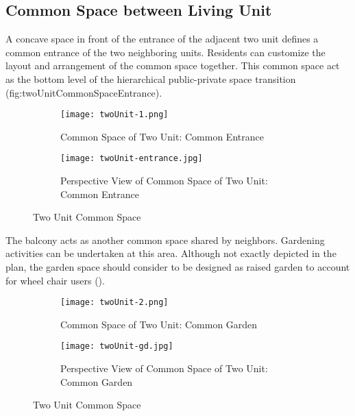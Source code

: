 \subsection{Common Space between Living Unit}
A concave space in front of the entrance of the adjacent two unit
defines a common entrance of the two neighboring units. Residents can
customize the layout and arrangement of the common space
together. This common space act as the bottom level of the
hierarchical public-private space transition
({fig:twoUnitCommonSpaceEntrance}).~
\begin{figure}[h!]
\centering
\begin{subfigure}{\textwidth}
  \centering
  \texttt{[image: twoUnit-1.png]}
  \caption{Common Space of Two Unit: Common Entrance}
  \label{fig:twoUnit-1}
\end{subfigure}
\begin{subfigure}{\textwidth}
  \centering
  \texttt{[image: twoUnit-entrance.jpg]}
  \caption{Perspective View of Common Space of Two Unit: Common Entrance}
  \label{fig:twoUnit-entrance}
\end{subfigure}
\caption{Two Unit Common Space}
\label{fig:twoUnitCommonSpaceEntrance}
\end{figure}

\clearpage
The balcony acts as another common space shared by
neighbors. Gardening activities can be undertaken at this
area. Although not exactly depicted in the plan, the garden space
should consider to be designed as raised garden to account for wheel
chair users ().~
\begin{figure}[h!]
\centering
\begin{subfigure}{\textwidth}
  \centering
  \texttt{[image: twoUnit-2.png]}
  \caption{Common Space of Two Unit: Common Garden}
  \label{fig:twoUnit-2}
\end{subfigure}
\begin{subfigure}{\textwidth}
  \centering
  \texttt{[image: twoUnit-gd.jpg]}
  \caption{Perspective View of Common Space of Two Unit: Common Garden}
  \label{fig:twoUnit-garden}
\end{subfigure}
\caption{Two Unit Common Space}
\label{fig:twoUnitCommonSpaceGarden}
\end{figure}

